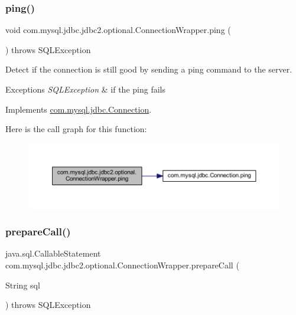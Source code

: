 \subsubsection{\texorpdfstring{ping()}{ping()}}
{\footnotesize\ttfamily void com.\+mysql.\+jdbc.\+jdbc2.\+optional.\+Connection\+Wrapper.\+ping (\begin{DoxyParamCaption}{ }\end{DoxyParamCaption}) throws S\+Q\+L\+Exception}

Detect if the connection is still good by sending a ping command to the server.


\begin{DoxyExceptions}{Exceptions}
{\em S\+Q\+L\+Exception} & if the ping fails \\
\hline
\end{DoxyExceptions}


Implements \mbox{\hyperlink{interfacecom_1_1mysql_1_1jdbc_1_1_connection_a65a9bf75714ed318b0324f99dfa09761}{com.\+mysql.\+jdbc.\+Connection}}.

Here is the call graph for this function\+:
\nopagebreak
\begin{figure}[H]
\begin{center}
\leavevmode
\includegraphics[width=350pt]{classcom_1_1mysql_1_1jdbc_1_1jdbc2_1_1optional_1_1_connection_wrapper_a2c2365e7096fe3cc215832ba1f7e3594_cgraph}
\end{center}
\end{figure}
\mbox{\label{classcom_1_1mysql_1_1jdbc_1_1jdbc2_1_1optional_1_1_connection_wrapper_ad32af1f66560d8d0ee1c74ad1e615c25}} 
\subsubsection{\texorpdfstring{prepare\+Call()}{prepareCall()}\hspace{0.1cm}{\footnotesize\ttfamily [1/3]}}
{\footnotesize\ttfamily java.\+sql.\+Callable\+Statement com.\+mysql.\+jdbc.\+jdbc2.\+optional.\+Connection\+Wrapper.\+prepare\+Call (\begin{DoxyParamCaption}\item[{String}]{sql }\end{DoxyParamCaption}) throws S\+Q\+L\+Exception}

